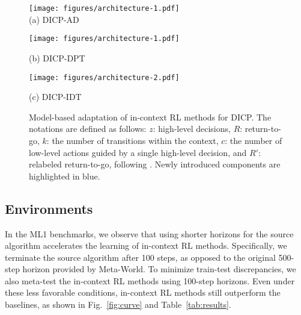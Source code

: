 \documentclass{article}
\begin{document}
\begin{figure}[t]
    \begin{center}
    \begin{minipage}{0.35\textwidth}
        \begin{center}
        \texttt{[image: figures/architecture-1.pdf]} \\
        \caption*{(a) DICP-AD}
        \vspace{0.30cm}
        \texttt{[image: figures/architecture-1.pdf]}
        \caption*{(b) DICP-DPT}
        \end{center}
    \end{minipage}%
    \hfill
    \begin{minipage}{0.64\textwidth}
        \begin{center}
            \texttt{[image: figures/architecture-2.pdf]}
        \caption*{(c) DICP-IDT}
        \end{center}
    \end{minipage}
    \end{center}
    \caption{Model-based adaptation of in-context RL methods for DICP.
    The notations are defined as follows: $z$: high-level decisions, $R$: return-to-go, $k$: the number of transitions within the context, $c$: the number of low-level actions guided by a single high-level decision, and $R'$: relabeled return-to-go, following \citep{IDT}.
    Newly introduced components are highlighted in blue.
    }
    \label{fig:models}
\end{figure}

\subsection{Environments}

In the ML1 benchmarks, we observe that using shorter horizons for the source algorithm accelerates the learning of in-context RL methods.
Specifically, we terminate the source algorithm after 100 steps, as opposed to the original 500-step horizon provided by Meta-World.
To minimize train-test discrepancies, we also meta-test the in-context RL methods using 100-step horizons.
Even under these less favorable conditions, in-context RL methods still outperform the baselines, as shown in Fig.~\ref{fig:curve} and Table~\ref{tab:results}.
\end{document}
